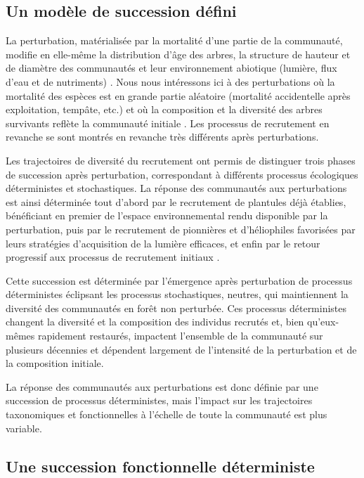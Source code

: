 \documentclass[
  11pt,
  french,
  A4paper,
  extrafontsizes,onecolumn,openright
  ]{memoir}
\begin{document}
\subsection{Un modèle de succession
défini}\label{un-modele-de-succession-defini}

La perturbation, matérialisée par la mortalité d'une partie de la
communauté, modifie en elle-même la distribution d'âge des arbres, la
structure de hauteur et de diamètre des communautés et leur
environnement abiotique (lumière, flux d'eau et de nutriments)
\autocites{Gourlet-Fleury2000}{Putz2012}{Piponiot2016}{Rutishauser2016}.
Nous nous intéressons ici à des perturbations où la mortalité des
espèces est en grande partie aléatoire (mortalité accidentelle après
exploitation, tempâte, etc.) et où la composition et la diversité des
arbres survivants reflète la communauté initiale \autocite{Herault2018}.
Les processus de recrutement en revanche se sont montrés en revanche
très différents après perturbations.

Les trajectoires de diversité du recrutement ont permis de distinguer
trois phases de succession après perturbation, correspondant à
différents processus écologiques déterministes et stochastiques. La
réponse des communautés aux perturbations est ainsi déterminée tout
d'abord par le recrutement de plantules déjà établies, bénéficiant en
premier de l'espace environnemental rendu disponible par la
perturbation, puis par le recrutement de pionnières et d'héliophiles
favorisées par leurs stratégies d'acquisition de la lumière efficaces,
et enfin par le retour progressif aux processus de recrutement initiaux
\autocites{Denslow2000}{Herault2010}{Herault2011}.

Cette succession est déterminée par l'émergence après perturbation de
processus déterministes éclipsant les processus stochastiques, neutres,
qui maintiennent la diversité des communautés en forêt non perturbée.
Ces processus déterministes changent la diversité et la composition des
individus recrutés et, bien qu'eux-mêmes rapidement restaurés, impactent
l'ensemble de la communauté sur plusieurs décennies et dépendent
largement de l'intensité de la perturbation et de la composition
initiale.

La réponse des communautés aux perturbations est donc définie par une
succession de processus déterministes, mais l'impact sur les
trajectoires taxonomiques et fonctionnelles à l'échelle de toute la
communauté est plus variable.

\subsection{Une succession fonctionnelle
déterministe}\label{une-succession-fonctionnelle-deterministe}
\end{document}
